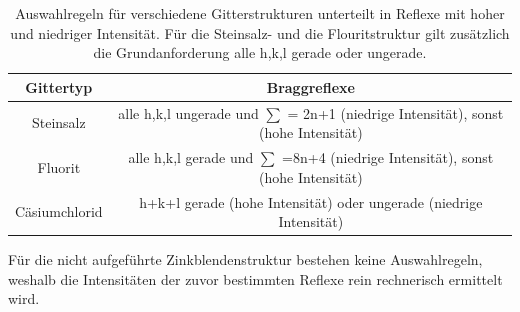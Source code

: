    \begin{table}
     \centering
     \caption{Auswahlregeln für verschiedene Gitterstrukturen unterteilt in Reflexe mit hoher und niedriger Intensität. Für die Steinsalz- und die Flouritstruktur gilt zusätzlich die Grundanforderung alle h,k,l gerade oder ungerade.}
     \label{tbl:beispieltabelle}
     \begin{tabular}{cc}
       \hline
       \textbf{Gittertyp}  & \textbf{Braggreflexe} \\
       \hline
       Steinsalz           & alle h,k,l ungerade und $\sum$ = 2n+1 (niedrige Intensität), sonst (hohe Intensität)     \\
       Fluorit             & alle h,k,l gerade und $\sum$ =8n+4 (niedrige Intensität), sonst (hohe Intensität)              \\
       Cäsiumchlorid       & h\:+\:k\:+\:l gerade (hohe Intensität) oder ungerade (niedrige Intensität)              \\
     \end{tabular}



   \end{table}








Für die nicht aufgeführte Zinkblendenstruktur bestehen keine Auswahlregeln, weshalb die Intensitäten der zuvor bestimmten Reflexe rein rechnerisch ermittelt wird.


